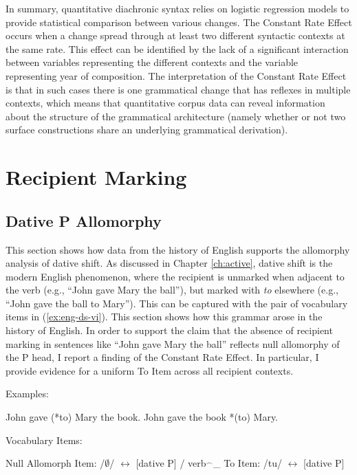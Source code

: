 	In summary, quantitative diachronic syntax relies on logistic regression models to provide statistical comparison between various changes. The Constant Rate Effect occurs when a change spread through at least two different syntactic contexts at the same rate. This effect can be identified by the lack of a significant interaction between variables representing the different contexts and the variable representing year of composition. The interpretation of the Constant Rate Effect is that in such cases there is one grammatical change that has reflexes in multiple contexts, which means that quantitative corpus data can reveal information about the structure of the grammatical architecture (namely whether or not two surface constructions share an underlying grammatical derivation).

\section{Recipient Marking}
\subsection{Dative P Allomorphy}
This section shows how data from the history of English supports the allomorphy analysis of dative shift. As discussed in Chapter \ref{ch:active}, dative shift is the modern English phenomenon, where the recipient is unmarked when adjacent to the verb (e.g., ``John gave Mary the ball''), but marked with \textit{to} elsewhere (e.g., ``John gave the ball to Mary''). This can be captured with the pair of vocabulary items in (\ref{ex:eng-ds-vi}). This section shows how this grammar arose in the history of English. In order to support the claim that the absence of recipient marking in sentences like ``John gave Mary the ball'' reflects null allomorphy of the P head, I report a finding of the Constant Rate Effect. In particular, I provide evidence for a uniform To Item across all recipient contexts.  

	\begin{exe}
		\ex Examples:
		\begin{xlist}
			\ex John gave (*to) Mary the book.
			\ex John gave the book *(to) Mary.
		\end{xlist}
		\ex Vocabulary Items:\label{ex:eng-ds-vi}
		\begin{xlist}
			\ex Null Allomorph Item: /$\emptyset$/ $\leftrightarrow$ [dative P] / verb$^{\smallfrown}$\_
			\ex To Item: /tu/ $\leftrightarrow$ [dative P]
		\end{xlist}
	\end{exe}

